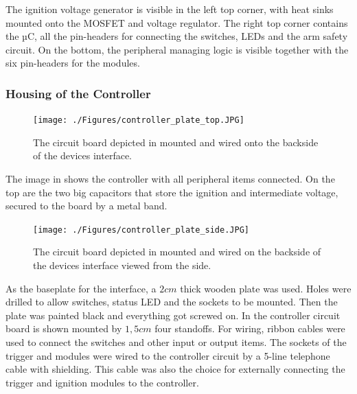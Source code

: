 \noindent The ignition voltage generator is visible in the left top corner, with heat sinks mounted onto the MOSFET and voltage regulator. The right top corner contains the µC, all the pin-headers for connecting the switches, LEDs and the arm safety circuit. On the bottom, the peripheral managing logic is visible together with the six pin-headers for the modules.



\pagebreak

\subsubsection{Housing of the Controller}
\label{Housing of the Controller}

\begin{figure}[!ht]
    \centering
    \texttt{[image: ./Figures/controller\_plate\_top.JPG]}
    \caption{ The circuit board depicted in  mounted and wired onto the backside of the devices interface. }
    \label{fig:controller_plate_top}     
\end{figure}

\noindent The image in  shows the controller with all peripheral items connected. On the top are the two big capacitors that store the ignition and intermediate voltage, secured to the board by a metal band.\\

\begin{figure}[!ht]
    \centering
    \texttt{[image: ./Figures/controller\_plate\_side.JPG]}
    \caption{ The circuit board depicted in  mounted and wired on the backside of the devices interface viewed from the side. }
    \label{fig:controller_plate_side}     
\end{figure}

\noindent As the baseplate for the interface, a $2cm$ thick wooden plate was used. Holes were drilled to allow switches, status LED and the sockets to be mounted. Then the plate was painted black and everything got screwed on. In  the controller circuit board is shown mounted by $1,5cm$ four standoffs. For wiring, ribbon cables were used to connect the switches and other input or output items. The sockets of the trigger and modules were wired to the controller circuit by a 5-line telephone cable with shielding. This cable was also the choice for externally connecting the trigger and ignition modules to the controller.   

